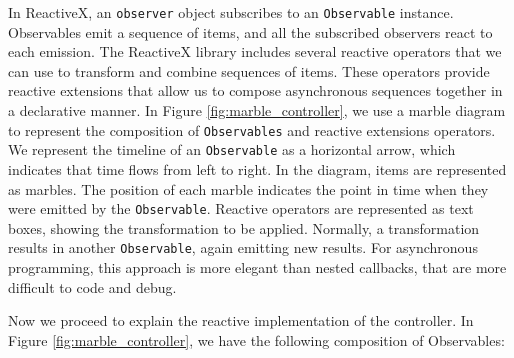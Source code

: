 \documentclass[review]{elsarticle}
\begin{document}
In ReactiveX, an \texttt{observer} object subscribes to an \texttt{Observable} instance. 
Observables emit a sequence of items, and all the subscribed observers react to each emission. The
ReactiveX library includes several reactive operators that we can use to
transform and combine sequences of items. These operators provide reactive
extensions that allow us to compose asynchronous sequences together in a
declarative manner. In Figure \ref{fig:marble_controller}, we use a marble diagram to
represent the composition of \texttt{Observables} and reactive extensions operators. We
represent the timeline of an \texttt{Observable} as a horizontal arrow, which indicates
that time flows from left to right. In the diagram, items are represented as
marbles. The position of each marble indicates the point in time when they were
emitted by the \texttt{Observable}. Reactive operators are represented as text boxes,
showing the transformation to be applied. Normally, a transformation results in
another \texttt{Observable}, again emitting new results.  For asynchronous programming, 
this approach is more elegant than nested callbacks, that are more difficult 
to code and debug. 

Now we proceed to explain the reactive implementation of the controller.
In Figure \ref{fig:marble_controller}, we  have the following composition of Observables:
\end{document}
